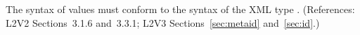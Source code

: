 The syntax of   values must conform to the syntax of the
XML type .  (References: L2V2 Sections~3.1.6 and~3.3.1;
L2V3 Sections~\ref{sec:metaid} and~\ref{sec:id}.)
